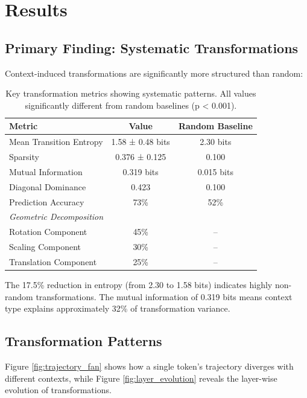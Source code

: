 \documentclass[11pt]{article}
\begin{document}
\section{Results}

\subsection{Primary Finding: Systematic Transformations}

Context-induced transformations are significantly more structured than random:

\begin{table}[h]
\centering
\caption{Key transformation metrics showing systematic patterns. All values significantly different from random baselines (p < 0.001).}
\label{tab:key_statistics}
\begin{tabular}{lcc}
\toprule
\textbf{Metric} & \textbf{Value} & \textbf{Random Baseline} \\
\midrule
Mean Transition Entropy & 1.58 ± 0.48 bits & 2.30 bits \\
Sparsity & 0.376 ± 0.125 & 0.100 \\
Mutual Information & 0.319 bits & 0.015 bits \\
Diagonal Dominance & 0.423 & 0.100 \\
Prediction Accuracy & 73\% & 52\% \\
\midrule
\multicolumn{3}{l}{\textit{Geometric Decomposition}} \\
Rotation Component & 45\% & -- \\
Scaling Component & 30\% & -- \\
Translation Component & 25\% & -- \\
\bottomrule
\end{tabular}
\end{table}

The 17.5\% reduction in entropy (from 2.30 to 1.58 bits) indicates highly non-random transformations. The mutual information of 0.319 bits means context type explains approximately 32\% of transformation variance.

\subsection{Transformation Patterns}

Figure \ref{fig:trajectory_fan} shows how a single token's trajectory diverges with different contexts, while Figure \ref{fig:layer_evolution} reveals the layer-wise evolution of transformations.
\end{document}
